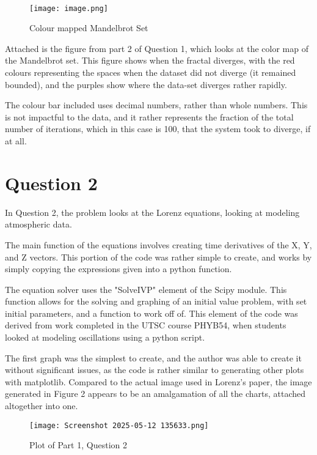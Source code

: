 \documentclass{article}
\begin{document}
\
\begin{figure}[H]
    \centering
    \texttt{[image: image.png]}
    \caption{Colour mapped Mandelbrot Set}
    \label{Figure 1}
\end{figure}

Attached is the figure from part 2 of Question 1, which looks at the color map of the Mandelbrot set. This figure shows when the fractal diverges, with the red colours representing the spaces when the dataset did not diverge (it remained bounded), and the purples show where the data-set diverges rather rapidly. 

The colour bar included uses decimal numbers, rather than whole numbers. This is not impactful to the data, and it rather represents the fraction of the total number of iterations, which in this case is 100, that the system took to diverge, if at all. 

\newpage    


\section{Question 2}


In Question 2, the problem looks at the Lorenz equations, looking at modeling atmospheric data. 

The main function of the equations involves creating time derivatives of the X, Y, and Z vectors. This portion of the code was rather simple to create, and works by simply copying the expressions given into a python function. 

The equation solver uses the "SolveIVP" element of the Scipy module. This function allows for the solving and graphing of an initial value problem, with set initial parameters, and a function to work off of. This element of the code was derived from work completed in the UTSC course PHYB54, when students looked at modeling oscillations using a python script. 

The first graph was the simplest to create, and the author was able to create it without significant issues, as the code is rather similar to generating other plots with matplotlib. Compared to the actual image used in Lorenz's paper, the image generated in Figure 2 appears to be an amalgamation of all the charts, attached altogether into one.

\begin{figure}[H]
    \centering
    \texttt{[image: Screenshot 2025-05-12 135633.png]}
    \caption{Plot of Part 1, Question 2}
    \label{Figure 2}
\end{figure}
\end{document}
